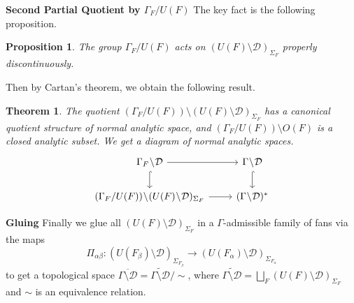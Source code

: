 \documentclass[11pt,english]{smfart}
\newtheorem{theorem}{Theorem}
\newtheorem{proposition}{Proposition}[section]
\theoremstyle{definition}
\theoremstyle{remark}
\newcommand{\under}{\!\setminus\!}
\renewcommand{\Im}{\mathop{\mathrm{Im}}}
\renewcommand{\bar}{\overline}
\renewcommand{\tilde}{\widetilde}
\begin{document}



\noindent\textbf{Second Partial Quotient by $\Gamma_F/U(F)$}
The key fact is the following proposition.
\begin{proposition}
    The group $\Gamma_F/U(F)$ acts on $(U(F)\under\mathcal{D})_{\Sigma_F}$ properly discontinuously.
\end{proposition}
Then by Cartan's theorem, we obtain the following result.
\begin{theorem}
    The quotient $(\Gamma_F/U(F))\under(U(F)\under\mathcal{D})_{\Sigma_F}$ has a canonical quotient structure of normal analytic space, and $(\Gamma_F/U(F))\under O(F)$ is a closed analytic subset.
    We get a diagram of normal analytic spaces. \[\begin{tikzcd}
        \Gamma_F\under\mathcal{D}                               \arrow[r] \arrow[d, hook] & \Gamma\under\mathcal{D} \arrow[d, hook]\\
        (\Gamma_F/U(F))\under(U(F)\under\mathcal{D})_{\Sigma_F} \arrow[r] & (\Gamma\under\mathcal{D})^*
    \end{tikzcd}\]
\end{theorem}


\noindent\textbf{Gluing}
Finally we glue all $(U(F)\under\mathcal{D})_{\Sigma_F}$ in a $\Gamma$-admissible family of fans via the maps \[\Pi_{\alpha\beta}: (U(F_\beta)\under\mathcal{D})_{\Sigma_{F_\beta}}\to (U(F_\alpha)\under\mathcal{D})_{\Sigma_{F_\alpha}}\]
to get a topological space $\bar{\Gamma\under\mathcal{D}} =  \tilde{\Gamma\under\mathcal{D}}/\sim$, where $\tilde{\Gamma\under\mathcal{D}} = \bigsqcup_{F}(U(F)\under\mathcal{D})_{\Sigma_F}$ and $\sim$ is an equivalence relation.
\end{document}
